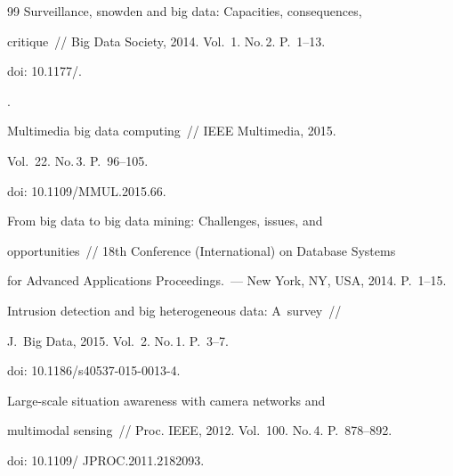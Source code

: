 {{\begin{thebibliography}{99}
   Surveillance, snowden and big data: Capacities, consequences, 


critique~/\!\!/ Big Data Society, 2014. Vol.~1. No.\,2. P.~1--13.


doi: 10.1177\!/.







.


Multimedia big data computing~/\!\!/ IEEE  Multimedia, 2015. 


Vol.~22. No.\,3. P.~96--105.


doi: 10.1109\!/\!MMUL.2015.66.


    






From big data to big data mining: Challenges, issues, and 


opportunities~/\!\!/ 18th  Conference (International) on Database Systems 


for Advanced Applications Proceedings.~--- New York, NY, USA, 2014. P.~1--15.


    






Intrusion detection and big heterogeneous data: A~survey~/\!\!/ 


J.~Big Data, 2015. Vol.~2. No.\,1. P.~3--7.


doi: 10.1186\!/\!s40537-015-0013-4.


    






Large-scale situation awareness with camera networks and 


multimodal sensing~/\!\!/ Proc. IEEE, 2012. Vol.~100. No.\,4. P.~878--892.


doi: 10.1109\!/ JPROC.2011.2182093.


    





\end{thebibliography}}}
